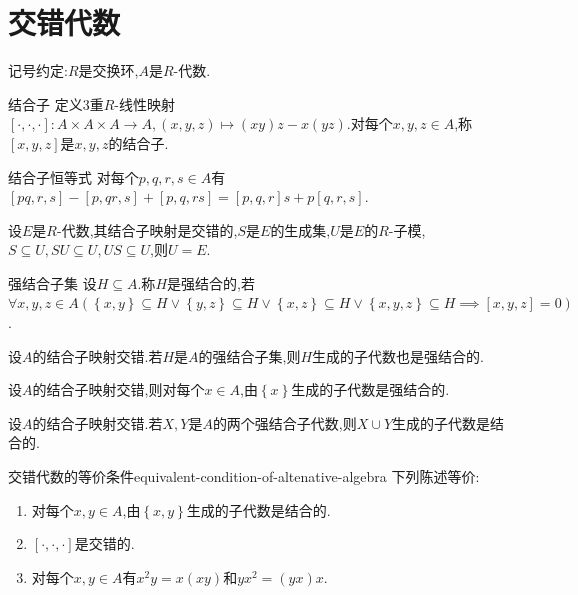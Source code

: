 
\section{交错代数}

记号约定:$R$是交换环,$A$是$R$-代数.

\begin{definition}{结合子}{}
	定义$3$重$R$-线性映射$\left[\cdot,\cdot,\cdot\right]:A\times A\times A\to A,\left(x,y,z\right)\mapsto\left(xy\right)z-x\left(yz\right)$.对每个$x,y,z\in A$,称$\left[x,y,z\right]$是$x,y,z$的结合子.
\end{definition}

\begin{lemma}{结合子恒等式}{}
	对每个$p,q,r,s\in A$有$\left[pq,r,s\right]-\left[p,qr,s\right]+\left[p,q,rs\right]=\left[p,q,r\right]s+p\left[q,r,s\right]$.
\end{lemma}

\begin{lemma}{}{}
	设$E$是$R$-代数,其结合子映射是交错的,$S$是$E$的生成集,$U$是$E$的$R$-子模,$S\subseteq U,SU\subseteq U,US\subseteq U$,则$U=E$.
\end{lemma}

\begin{definition}{强结合子集}{}
	设$H\subseteq A$.称$H$是强结合的,若$\forall x,y,z\in A\left(\left\{x,y\right\}\subseteq H\vee\left\{y,z\right\}\subseteq H\vee\left\{x,z\right\}\subseteq H\vee\left\{x,y,z\right\}\subseteq H\implies\left[x,y,z\right]=0\right)$.
\end{definition}

\begin{lemma}{}{}
	设$A$的结合子映射交错.若$H$是$A$的强结合子集,则$H$生成的子代数也是强结合的.
\end{lemma}

\begin{lemma}{}{}
	设$A$的结合子映射交错,则对每个$x\in A$,由$\left\{x\right\}$生成的子代数是强结合的.
\end{lemma}

\begin{lemma}{}{}
	设$A$的结合子映射交错.若$X,Y$是$A$的两个强结合子代数,则$X\cup Y$生成的子代数是结合的.
\end{lemma}

\begin{proposition}{交错代数的等价条件}{equivalent-condition-of-altenative-algebra}
	下列陈述等价:
	\begin{enumerate}
		\item 对每个$x,y\in A$,由$\left\{x,y\right\}$生成的子代数是结合的.
		\item $\left[\cdot,\cdot,\cdot\right]$是交错的.
		\item 对每个$x,y\in A$有$x^{2}y=x\left(xy\right)$和$yx^{2}=\left(yx\right)x$.
	\end{enumerate}
\end{proposition}

